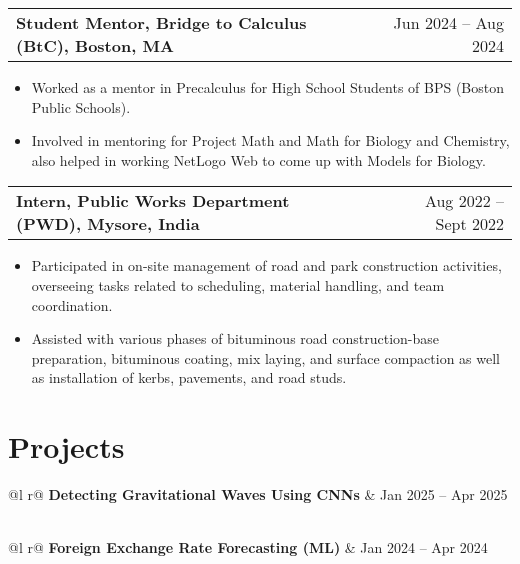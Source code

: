 \documentclass[a4paper,10pt]{article}
\makeatletter
\newenvironment{joblong}[2]
    {
    \begin{tabularx}{\linewidth}{@{}l X r@{}}
    \textbf{#1} & \hfill &  #2 \\[2pt]
    \end{tabularx}
    \begin{minipage}[t]{\linewidth}
    \begin{itemize}[nosep,leftmargin=1em, itemsep=2pt,label=--]
    }
    {
    \end{itemize}
    \end{minipage}    
    }
\makeatother
\begin{document}
\begin{joblong}{Student Mentor, Bridge to Calculus (BtC), Boston, MA}{Jun 2024 -- Aug 2024}
\item Worked as a mentor in Precalculus for High School Students of BPS (Boston Public Schools).  
\item Involved in mentoring for Project Math and Math for Biology and Chemistry, also helped in working NetLogo Web to come up with Models for Biology.  
\end{joblong}

\begin{joblong}{Intern, Public Works Department (PWD), Mysore, India}{Aug 2022 -- Sept 2022}
\item Participated in on-site management of road and park construction activities, overseeing tasks related to scheduling, material handling, and team coordination.  
\item Assisted with various phases of bituminous road construction-base preparation, bituminous coating, mix laying, and surface compaction as well as installation of kerbs, pavements, and road studs.  
\end{joblong}

\section{Projects}

\begin{tabularx}{\linewidth}{ @{}l r@{} }
\textbf{Detecting Gravitational Waves Using CNNs} & \hfill Jan 2025 -- Apr 2025 \\
 \\
\end{tabularx}

\begin{tabularx}{\linewidth}{ @{}l r@{} }
\textbf{Foreign Exchange Rate Forecasting (ML)} & \hfill Jan 2024 -- Apr 2024 \\
 \\
\end{tabularx}
\end{document}
